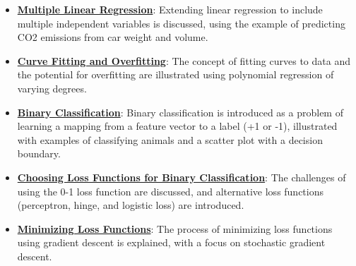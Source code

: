 \documentclass{article}%
\begin{document}
\begin{itemize}[leftmargin=*]
\item \href{https://purdue.brightspace.com/d2l/common/assets/pdfjs-d2l-dist/1.0.14-legacy/web/viewer.html?file=\%2Fcontent\%2Fenforced\%2F1095467-wl.202510.CS.24300.001\%2F05L2-ML Basics.pdf\%3Fou\%3D1095467\&lang=en-us\&container=d2l-fileviewer-rendered-pdf\&fullscreen=d2l-fileviewer-rendered-pdf-dialog\&height=667#page=11}{\textbf{Multiple Linear Regression}}: Extending linear regression to include multiple independent variables is discussed, using the example of predicting CO2 emissions from car weight and volume.%
\item \href{https://purdue.brightspace.com/d2l/common/assets/pdfjs-d2l-dist/1.0.14-legacy/web/viewer.html?file=\%2Fcontent\%2Fenforced\%2F1095467-wl.202510.CS.24300.001\%2F05L2-ML Basics.pdf\%3Fou\%3D1095467\&lang=en-us\&container=d2l-fileviewer-rendered-pdf\&fullscreen=d2l-fileviewer-rendered-pdf-dialog\&height=667#page=13}{\textbf{Curve Fitting and Overfitting}}: The concept of fitting curves to data and the potential for overfitting are illustrated using polynomial regression of varying degrees.%
\item \href{https://purdue.brightspace.com/d2l/common/assets/pdfjs-d2l-dist/1.0.14-legacy/web/viewer.html?file=\%2Fcontent\%2Fenforced\%2F1095467-wl.202510.CS.24300.001\%2F05L2-ML Basics.pdf\%3Fou\%3D1095467\&lang=en-us\&container=d2l-fileviewer-rendered-pdf\&fullscreen=d2l-fileviewer-rendered-pdf-dialog\&height=667#page=20}{\textbf{Binary Classification}}: Binary classification is introduced as a problem of learning a mapping from a feature vector to a label (+1 or -1), illustrated with examples of classifying animals and a scatter plot with a decision boundary.%
\item \href{https://purdue.brightspace.com/d2l/common/assets/pdfjs-d2l-dist/1.0.14-legacy/web/viewer.html?file=\%2Fcontent\%2Fenforced\%2F1095467-wl.202510.CS.24300.001\%2F05L2-ML Basics.pdf\%3Fou\%3D1095467\&lang=en-us\&container=d2l-fileviewer-rendered-pdf\&fullscreen=d2l-fileviewer-rendered-pdf-dialog\&height=667#page=25}{\textbf{Choosing Loss Functions for Binary Classification}}: The challenges of using the 0-1 loss function are discussed, and alternative loss functions (perceptron, hinge, and logistic loss) are introduced.%
\item \href{https://purdue.brightspace.com/d2l/common/assets/pdfjs-d2l-dist/1.0.14-legacy/web/viewer.html?file=\%2Fcontent\%2Fenforced\%2F1095467-wl.202510.CS.24300.001\%2F05L2-ML Basics.pdf\%3Fou\%3D1095467\&lang=en-us\&container=d2l-fileviewer-rendered-pdf\&fullscreen=d2l-fileviewer-rendered-pdf-dialog\&height=667#page=28}{\textbf{Minimizing Loss Functions}}: The process of minimizing loss functions using gradient descent is explained, with a focus on stochastic gradient descent.%

\end{itemize}
\end{document}
